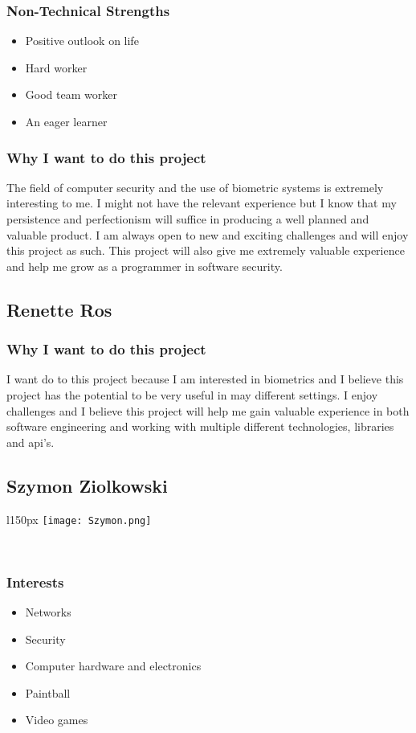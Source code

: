 \subsubsection{Non-Technical Strengths}
\begin{itemize}
	\item{Positive outlook on life}
	\item{Hard worker}
	\item{Good team worker}
	\item{An eager learner}
\end{itemize}
\subsubsection{Why I want to do this project}
The field of computer security and the use of biometric systems is extremely interesting to me. I might not have the relevant experience but I know that my persistence and perfectionism will suffice in producing a well planned and valuable product. I am always open to new and exciting challenges and will enjoy this project as such. This project will also give me extremely valuable experience and help me grow as a programmer in software security.

\pagebreak
\subsection{Renette Ros}

\subsubsection{Why I want to do this project} 
I want do to this project because I am interested in biometrics and I believe this project has the potential to be very useful in may different settings. I enjoy challenges and I believe this project will help me gain valuable experience in both software engineering and working with multiple different technologies, libraries and api's. 

\pagebreak
\subsection{Szymon Ziolkowski}
\begin{wrapfigure}[5]{l}{150px}
\vspace{10pt}
\texttt{[image: Szymon.png]}
\end{wrapfigure}

\textcolor{white}{.}
\subsubsection{Interests}
	\begin{itemize}
		\item Networks
		\item Security
		\item Computer hardware and electronics
		\item Paintball
		\item Video games
	\end{itemize}
